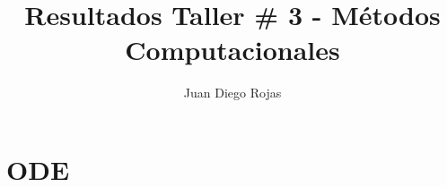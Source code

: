 \documentclass{article}
\title{Resultados Taller \# 3 - Métodos Computacionales}
\author{Juan Diego Rojas}
\begin{document}
	\maketitle
	\section{ODE}
	
\end{document}
